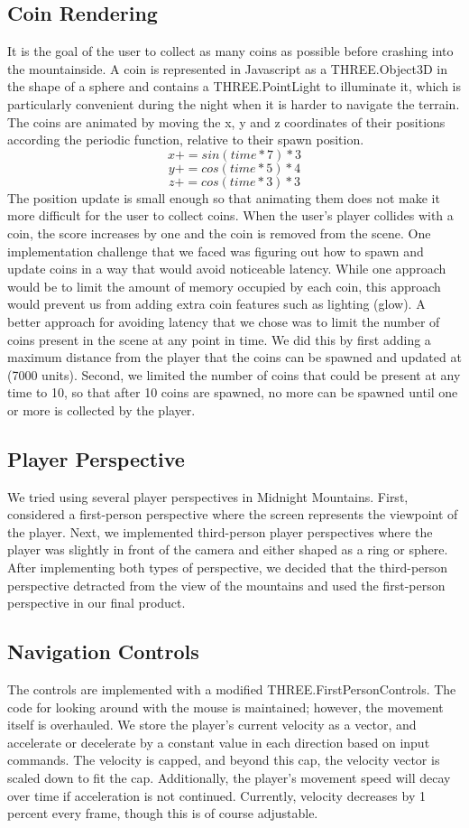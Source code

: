 \documentclass{article}
\begin{document}
\subsection{Coin Rendering}
It is the goal of the user to collect as many coins as possible before crashing into the mountainside.  A coin is represented in Javascript as a THREE.Object3D in the shape of a sphere and contains a THREE.PointLight to illuminate it, which is particularly convenient during the night when it is harder to navigate the terrain.  The coins are animated by moving the x, y and z coordinates of their positions according the periodic function, relative to their spawn position.
$$x += sin( time * 7 ) * 3$$
$$y += cos( time * 5 ) * 4$$
$$z += cos( time * 3 ) * 3$$
The position update is small enough so that animating them does not make it more difficult for the user to collect coins.  When the user's player collides with a coin, the score increases by one and the coin is removed from the scene.  One implementation challenge that we faced was figuring out how to spawn and update coins in a way that would avoid noticeable latency.  While one approach would be to limit the amount of memory occupied by each coin, this approach would prevent us from adding extra coin features such as lighting (glow).  A better approach for avoiding latency that we chose was to limit the number of coins present in the scene at any point in time.  We did this by first adding a maximum distance from the player that the coins can be spawned and updated at (7000 units).  Second, we limited the number of coins that could be present at any time to 10, so that after 10 coins are spawned, no more can be spawned until one or more is collected by the player.

\subsection{Player Perspective}
We tried using several player perspectives in Midnight Mountains.  First, considered a first-person perspective where the screen represents the viewpoint of the player.  Next, we implemented third-person player perspectives where the player was slightly in front of the camera and either shaped as a ring or sphere.  After implementing both types of perspective, we decided that the third-person perspective detracted from the view of the mountains and used the first-person perspective in our final product.

\subsection{Navigation Controls}
The controls are implemented with a modified THREE.FirstPersonControls. The code for looking around with the mouse is maintained; however, the movement itself is overhauled. We store the player's current velocity as a vector, and accelerate or decelerate by a constant value in each direction based on input commands. The velocity is capped, and beyond this cap, the velocity vector is scaled down to fit the cap. Additionally, the player's movement speed will decay over time if acceleration is not continued. Currently, velocity decreases by 1 percent every frame, though this is of course adjustable.
\end{document}
